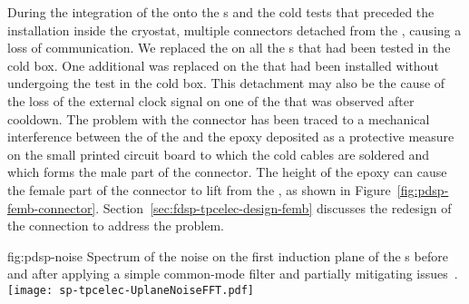 \begin{comment}During the integration of the \dwords{femb} onto the \dword{apa}s 
and the cold tests that preceded the \dwords{apa} installation
inside the \dword{pdsp} cryostat a problem occurred %
on the 
connection between the cold readout and control cables and the
\dwords{femb}. In multiple cases the connector %
detached from
the \dword{femb} causing a loss of communication. 
\end{comment}
During the integration of the  onto the s 
and the cold tests that preceded the  installation
inside the  cryostat,  multiple connectors  
detached from
the , causing a loss of communication.  
We replaced the  %
on all the s that had been tested in the cold box. %
One additional  was 
replaced on the  that had been installed without undergoing 
the test in the cold box. This %
detachment may also be the cause
of the loss of the external clock signal on one of the 
that was observed after cooldown. %
%
The problem 
with the connector has been traced to a mechanical interference between 
the  of the  and the epoxy deposited as a protective measure on the small printed circuit
board to which the cold cables are soldered and which forms the 
male part of the connector. The height of the epoxy can cause 
the female part of the connector to lift from the ,
as shown in 
Figure~\ref{fig:pdsp-femb-connector}. %
Section~\ref{sec:fdsp-tpcelec-design-femb} discusses the redesign of the connection to address the problem.


\begin{dunefigure}
{fig:pdsp-noise}
{Spectrum of the noise on the first induction plane of the  s before
 and after applying a simple common-mode filter and partially mitigating  issues~\cite{pend_PDSP_PerfPaper}.}
\texttt{[image: sp-tpcelec-UplaneNoiseFFT.pdf]}
\end{dunefigure}


